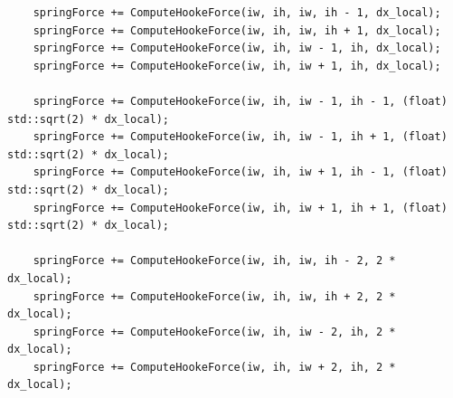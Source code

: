 \documentclass[acmtog]{acmart}
\begin{document}
\begin{enumerate}
\begin{lstlisting}
	springForce += ComputeHookeForce(iw, ih, iw, ih - 1, dx_local);
	springForce += ComputeHookeForce(iw, ih, iw, ih + 1, dx_local);
	springForce += ComputeHookeForce(iw, ih, iw - 1, ih, dx_local);
	springForce += ComputeHookeForce(iw, ih, iw + 1, ih, dx_local);

	springForce += ComputeHookeForce(iw, ih, iw - 1, ih - 1, (float) std::sqrt(2) * dx_local);
	springForce += ComputeHookeForce(iw, ih, iw - 1, ih + 1, (float) std::sqrt(2) * dx_local);
	springForce += ComputeHookeForce(iw, ih, iw + 1, ih - 1, (float) std::sqrt(2) * dx_local);
	springForce += ComputeHookeForce(iw, ih, iw + 1, ih + 1, (float) std::sqrt(2) * dx_local);

	springForce += ComputeHookeForce(iw, ih, iw, ih - 2, 2 * dx_local);
	springForce += ComputeHookeForce(iw, ih, iw, ih + 2, 2 * dx_local);
	springForce += ComputeHookeForce(iw, ih, iw - 2, ih, 2 * dx_local);
	springForce += ComputeHookeForce(iw, ih, iw + 2, ih, 2 * dx_local);


\end{lstlisting}
\end{enumerate}
\end{document}
